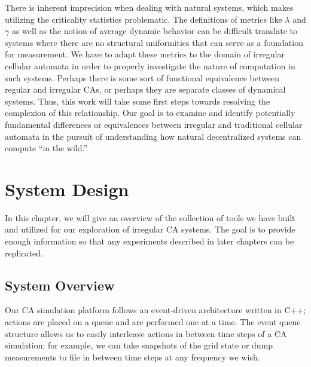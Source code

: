 \documentclass[a4paper,11pt,twoside]{report}
\begin{document}
There is inherent imprecision when dealing with natural systems, which makes utilizing the criticality statistics problematic. The definitions of metrics like $\lambda$ and $\gamma$ as well as the notion of average dynamic behavior can be difficult translate to systems where there are no structural uniformities that can serve as a foundation for measurement. We have to adapt these metrics to the domain of irregular cellular automata in order to properly investigate the nature of computation in such systems. Perhaps there is some sort of functional equivalence between regular and irregular CAs, or perhaps they are separate classes of dynamical systems. Thus, this work will take some first steps towards resolving the complexion of this relationship. Our goal is to examine and identify potentially fundamental differences or equivalences between irregular and traditional cellular automata in the pursuit of understanding how natural decentralized systems can compute ``in the wild.''




\processdelayedfloats

\chapter{System Design}
\label{ch:System}

In this chapter, we will give an overview of the collection of tools we have built and utilized for our exploration of irregular CA systems. The goal is to provide enough information so that any experiments described in later chapters can be replicated. 

\section{System Overview}
\label{sec:SysOverview}

Our CA simulation platform follows an event-driven architecture written in C++; actions are placed on a queue and are performed one at a time. The event queue structure allows us to easily interleave actions in between time steps of a CA simulation; for example, we can take snapshots of the grid state or dump measurements to file in between time steps at any frequency we wish.
\end{document}
